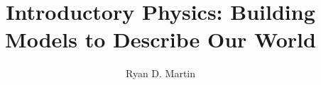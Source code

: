 \documentclass[12pt, openany]{book}
\begin{document}
\title{Introductory Physics: Building Models to Describe Our World}
\author{Ryan D. Martin}
\maketitle
{}
%
\tableofcontents
{}


%
%
%
%
%
%
%
%
%
%
%
%
%
%

%


%

%
%
%
\end{document}
